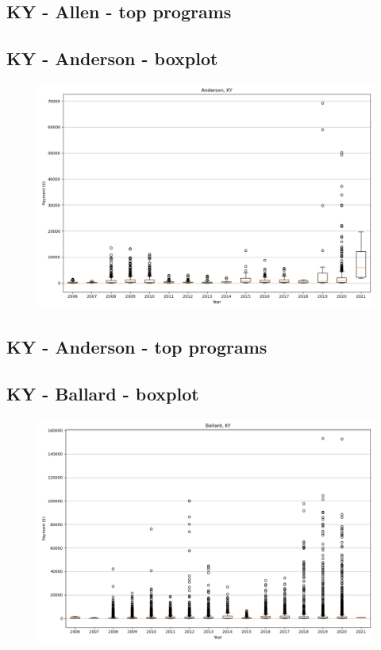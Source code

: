 \subsection*{KY - Allen - top programs}

\newpage
\subsection*{KY - Anderson - boxplot}
\begin{figure}[h]
\centering
\includegraphics[width=7in]{../output/boxplots/counties/Anderson-KY_boxplot.png}
\end{figure}


\subsection*{KY - Anderson - top programs}

\newpage
\subsection*{KY - Ballard - boxplot}
\begin{figure}[h]
\centering
\includegraphics[width=7in]{../output/boxplots/counties/Ballard-KY_boxplot.png}
\end{figure}


